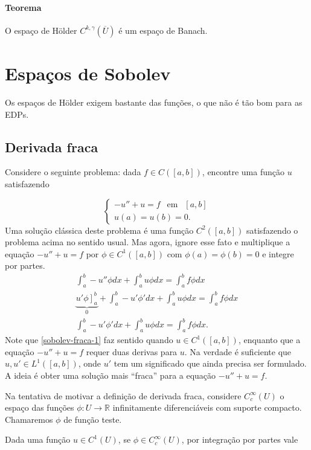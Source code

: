 \documentclass[11pt]{article}
\newcommand{\holder}[2][k,\gamma]{{C^{#1}(\overline{#2})}}
\begin{document}
\paragraph{Teorema} O espaço de Hölder \( \holder{U} \) é um espaço de Banach.


\section{Espaços de Sobolev}

Os espaços de Hölder exigem bastante das funções, o que não é tão bom para as EDPs.

\subsection*{Derivada fraca}

Considere o seguinte problema: dada $f \in C([a,b])$, encontre uma função $u$ satisfazendo

\[ \begin{cases}
-u'' +u =f \ \ \mbox{ em } \ \ [a,b] \\
	u(a)=u(b)=0.
\end{cases} \]
Uma solução clássica deste problema é uma função $C^2([a,b])$ satisfazendo o problema acima no sentido usual. Mas agora, ignore esse fato e multiplique a equação $-u'' +u =f $ por $\phi \in C^1([a,b])$ com $\phi(a)=\phi(b)=0$ e integre por partes.
\begin{align}\label{sobolev-fraca-1}
\int_a^b -u'' \phi dx +  \int_a^b u \phi dx =  \int_a^b f \phi dx\nonumber \\
\underbrace{\left. u' \phi \right]_a^b}_{0} + \int_a^b -u' \phi' dx +  \int_a^b u \phi dx =  \int_a^b f \phi dx \nonumber\\
\int_a^b -u' \phi' dx +  \int_a^b u \phi dx =  \int_a^b f \phi dx .
\end{align}
Note que \eqref{sobolev-fraca-1} faz sentido quando $u \in C^1([a,b])$, enquanto que a equação  $-u'' +u =f $ requer duas derivas para $u$. Na verdade é suficiente que $u, u' \in L^1([a,b])$, onde $u'$ tem um significado que ainda precisa ser formulado. A ideia é obter uma solução mais ``fraca'' para a equação $-u'' +u =f $.

Na tentativa de motivar a definição de derivada fraca, considere $C^{\infty}_c (U)$ o espaço das funções $ \phi :U \longrightarrow \mathbb{R}$ infinitamente diferenciáveis com suporte compacto. Chamaremos $\phi$ de função teste.

Dada uma função $u \in C^1(U)$, se $\phi \in C^{\infty}_c (U)$, por integração por partes vale
\end{document}
